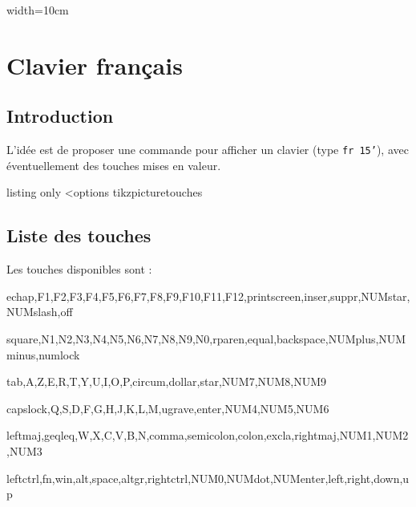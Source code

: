 \documentclass[french,11pt,a4paper]{article}
\begin{document}
\begin{DemoCode}{}
\begin{tcboxnotebook}[orientation=H]{width=10cm}
\lipsum[1]
\end{tcboxnotebook}
\end{DemoCode}

\begin{DemoCode}{}
\begin{tcboxnotebook}[bg=violet!25]{}
\lipsum[1]
\end{tcboxnotebook}
\end{DemoCode}

\pagebreak

\section{Clavier français}

\subsection{Introduction}

L'idée est de proposer une commande pour afficher un clavier (type \texttt{fr 15'}), avec éventuellement des touches mises en valeur.

\begin{DemoCode}{listing only}
\ClavierFrancais[clés]<options tikzpicture{touches}
\end{DemoCode}

\begin{DemoCode}{}
\ClavierFrancais{}
\end{DemoCode}

\subsection{Liste des touches}

Les touches disponibles sont :

\begin{ttfamily}
echap,F1,F2,F3,F4,F5,F6,F7,F8,F9,F10,F11,F12,printscreen,inser,suppr,NUMstar,NUMslash,off

square,N1,N2,N3,N4,N5,N6,N7,N8,N9,N0,rparen,equal,backspace,NUMplus,NUMminus,numlock

tab,A,Z,E,R,T,Y,U,I,O,P,circum,dollar,star,NUM7,NUM8,NUM9

capslock,Q,S,D,F,G,H,J,K,L,M,ugrave,enter,NUM4,NUM5,NUM6

leftmaj,geqleq,W,X,C,V,B,N,comma,semicolon,colon,excla,rightmaj,NUM1,NUM2,NUM3

leftctrl,fn,win,alt,space,altgr,rightctrl,NUM0,NUMdot,NUMenter,left,right,down,up
\end{ttfamily}
\end{document}
